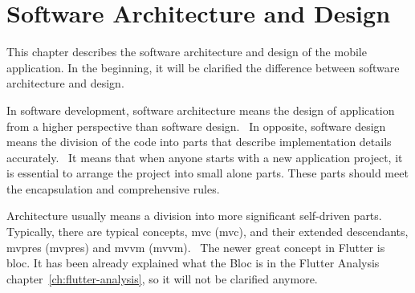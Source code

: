 \chapter{Software Architecture and Design}\label{ch:software-architecture-and-design}
This chapter describes the software architecture and design of the mobile application.
In the beginning, it will be clarified the difference between software architecture and design.

In software development, software architecture means the design of application from a higher perspective than software design.~\cite{softwareArchitecture}
In opposite, software design means the division of the code into parts that describe implementation details accurately.~\cite{softwareDesign}
It means that when anyone starts with a new application project, it is essential to arrange the project into small alone parts.
These parts should meet the encapsulation and comprehensive rules.

Architecture usually means a division into more significant self-driven parts.
Typically, there are typical concepts, \acrshort{mvc} (\acrlong{mvc}), and their extended descendants, \acrshort{mvpres} (\acrlong{mvpres}) and \acrshort{mvvm} (\acrlong{mvvm}).~\cite{mvc}
The newer great concept in Flutter is \acrshort{bloc}.
It has been already explained what the Bloc is in the Flutter Analysis chapter~\ref{ch:flutter-analysis}, so it will not be clarified anymore.




